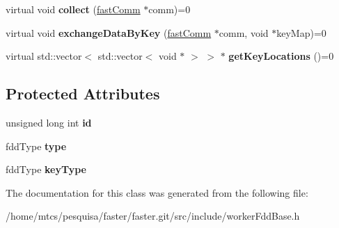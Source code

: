 \begin{DoxyCompactItemize}
\item 
\hypertarget{classfaster_1_1workerFddBase_ab9f9ea54f3480513b53e40760399e569}{}virtual void {\bfseries collect} (\hyperlink{classfaster_1_1fastComm}{fast\+Comm} $\ast$comm)=0\label{classfaster_1_1workerFddBase_ab9f9ea54f3480513b53e40760399e569}

\item 
\hypertarget{classfaster_1_1workerFddBase_a4a9b7afbb072da590bd5d93e46d1052a}{}virtual void {\bfseries exchange\+Data\+By\+Key} (\hyperlink{classfaster_1_1fastComm}{fast\+Comm} $\ast$comm, void $\ast$key\+Map)=0\label{classfaster_1_1workerFddBase_a4a9b7afbb072da590bd5d93e46d1052a}

\item 
\hypertarget{classfaster_1_1workerFddBase_a7ceebadaee829b6c3c8e247060abc41d}{}virtual std\+::vector$<$ std\+::vector$<$ void $\ast$ $>$ $>$ $\ast$ {\bfseries get\+Key\+Locations} ()=0\label{classfaster_1_1workerFddBase_a7ceebadaee829b6c3c8e247060abc41d}

\end{DoxyCompactItemize}
\subsection*{Protected Attributes}
\begin{DoxyCompactItemize}
\item 
\hypertarget{classfaster_1_1workerFddBase_ab131549612a7a269aab35c1920f0e215}{}unsigned long int {\bfseries id}\label{classfaster_1_1workerFddBase_ab131549612a7a269aab35c1920f0e215}

\item 
\hypertarget{classfaster_1_1workerFddBase_a220b88e4e5633d9ee7c8c8697a9ff297}{}fdd\+Type {\bfseries type}\label{classfaster_1_1workerFddBase_a220b88e4e5633d9ee7c8c8697a9ff297}

\item 
\hypertarget{classfaster_1_1workerFddBase_ab5d502564e1c1b12e806033380431afb}{}fdd\+Type {\bfseries key\+Type}\label{classfaster_1_1workerFddBase_ab5d502564e1c1b12e806033380431afb}

\end{DoxyCompactItemize}


The documentation for this class was generated from the following file\+:\begin{DoxyCompactItemize}
\item 
/home/mtcs/pesquisa/faster/faster.\+git/src/include/worker\+Fdd\+Base.\+h\end{DoxyCompactItemize}
